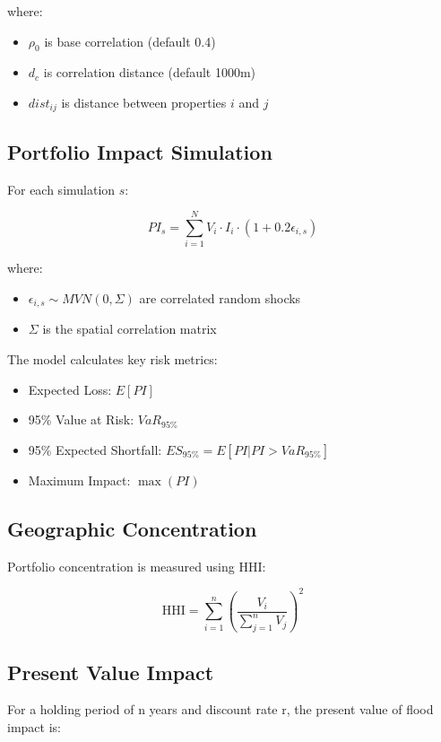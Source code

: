 \documentclass{article}
\begin{document}
where:
\begin{itemize}
\item $\rho_0$ is base correlation (default 0.4)
\item $d_c$ is correlation distance (default 1000m)
\item $dist_{ij}$ is distance between properties $i$ and $j$
\end{itemize}

\subsection{Portfolio Impact Simulation}
For each simulation $s$:

\begin{equation}
PI_s = \sum_{i=1}^{N} V_i \cdot I_i \cdot (1 + 0.2 \epsilon_{i,s})
\end{equation}

where:
\begin{itemize}
\item $\epsilon_{i,s} \sim MVN(0, \Sigma)$ are correlated random shocks
\item $\Sigma$ is the spatial correlation matrix
\end{itemize}

The model calculates key risk metrics:
\begin{itemize}
\item Expected Loss: $E[PI]$
\item 95\% Value at Risk: $VaR_{95\%}$
\item 95\% Expected Shortfall: $ES_{95\%} = E[PI|PI > VaR_{95\%}]$
\item Maximum Impact: $\max(PI)$
\end{itemize}

\subsection{Geographic Concentration}
Portfolio concentration is measured using HHI:

\begin{equation}
\text{HHI} = \sum_{i=1}^{n} \left(\frac{V_i}{\sum_{j=1}^{n} V_j}\right)^2
\end{equation}

\subsection{Present Value Impact}
For a holding period of n years and discount rate r, the present value of flood impact is:
\end{document}
